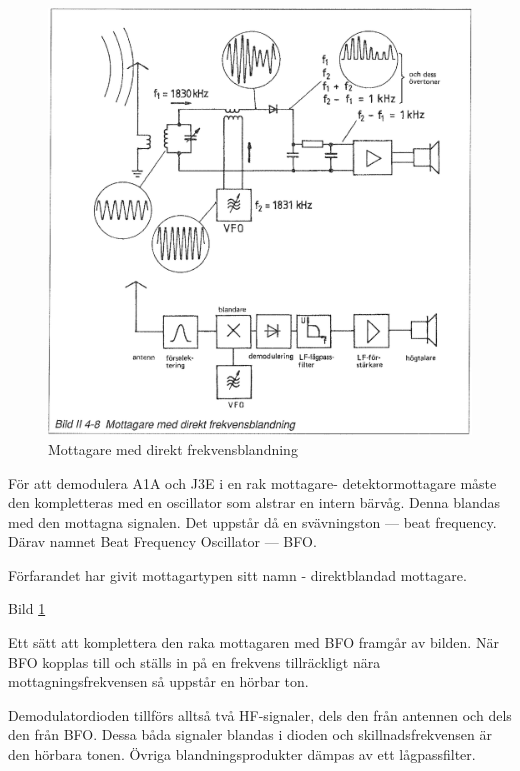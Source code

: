 \begin{figure}
  \includegraphics[width=\textwidth]{images/bild_2_4-08}
  \caption{Mottagare med direkt frekvensblandning}
  \label{fig:bildII4-8}
\end{figure}

För att demodulera A1A och J3E i en rak mottagare-
detektormottagare måste den kompletteras med en oscillator som alstrar
en intern bärvåg. Denna blandas med den mottagna signalen. Det uppstår
då en svävningston --- beat frequency. Därav namnet Beat Frequency
Oscillator --- BFO.

Förfarandet har givit mottagartypen sitt namn - direktblandad
mottagare.

Bild \ref{fig:bildII4-8}

Ett sätt att komplettera den raka mottagaren med BFO framgår av
bilden. När BFO kopplas till och ställs in på en frekvens tillräckligt
nära mottagningsfrekvensen så uppstår en hörbar ton.

Demodulatordioden tillförs alltså två HF-signaler, dels den från
antennen och dels den från BFO. Dessa båda signaler blandas i dioden
och skillnadsfrekvensen är den hörbara tonen. Övriga
blandningsprodukter dämpas av ett lågpassfilter.

